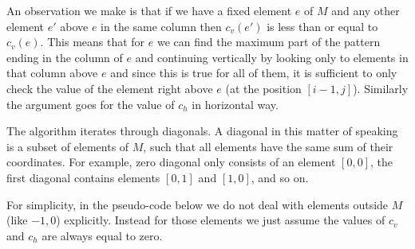 An observation we make is that if we have a fixed element $e$ of $M$ and any other element $e'$ above $e$ in the same column then $c_v(e')$ is less than or equal to $c_v(e)$. This means that for $e$ we can find the maximum part of the pattern ending in the column of $e$ and continuing vertically by looking only to elements in that column above $e$ and since this is true for all of them, it is sufficient to only check the value of the element right above $e$ (at the position $[i-1,j]$). Similarly the argument goes for the value of $c_h$ in horizontal way.

The algorithm iterates through diagonals. A diagonal in this matter of speaking is a subset of elements of $M$, such that all elements have the same sum of their coordinates. For example, zero diagonal only consists of an element $[0,0]$, the first diagonal contains elements $[0,1]$ and $[1,0]$, and so on.

For simplicity, in the pseudo-code below we do not deal with elements outside $M$ (like $-1,0$) explicitly. Instead for those elements we just assume the values of $c_v$ and $c_h$ are always equal to zero.

